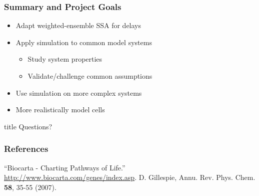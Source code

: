 \documentclass[xcolor={usenames,dvipsnames,svgnames}]{beamer}
\begin{document}
\begin{frame}
    \frametitle{Summary and Project Goals}
    \begin{itemize}
        \item Adapt weighted-ensemble SSA for delays
        \item Apply simulation to common model systems
        \begin{itemize}
            \item Study system properties
            \item Validate/challenge common assumptions
        \end{itemize}
        \item Use simulation on more complex systems
        \item More realistically model cells
    \end{itemize}
\end{frame}

\begin{frame}[plain]

\hfill
    \begin{beamercolorbox}[rounded=true, center, shadow=true,wd=6cm]{title}
        \huge Questions?
    \end{beamercolorbox}
\hfill\hfill

\end{frame}

\appendix

\begin{frame}
    \frametitle{References}
    \begin{thebibliography}{9}
         ``Biocarta - Charting Pathways of Life.'' \url{http://www.biocarta.com/genes/index.asp}.
         D. Gillespie, Annu. Rev. Phys. Chem. \textbf{58}, 35-55 (2007).
        
    \end{thebibliography}
\end{frame}
\end{document}
